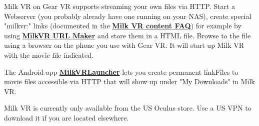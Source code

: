 \begin{fullwidth}
Milk VR on Gear VR supports streaming your own files via HTTP. Start a Webserver (you probably already have one running on your NAS), create special "milkvr:" links (documented in the \textbf{\href{https://milkvr.com/#/content/faq}{Milk VR content FAQ}}) for example by using \textbf{\href{https://github.com/abnormalend/milkvr-url-maker}{MilkVR URL Maker}} and store them in a HTML file. Browse to the file using a browser on the phone you use with Gear VR. It will start up Milk VR with the movie file indicated.

The Android app \textbf{\href{https://github.com/heavykick/MilkVRLauncher/releases}{MilkVRLauncher}} lets you create permanent linkFiles to movie files accessible via HTTP that will show up under "My Downloads" in Milk VR.

Milk VR is currently only available from the US Oculus store. Use a US VPN to download it if you are located elsewhere.

\clearpage
\end{fullwidth}
